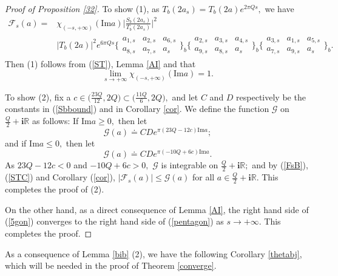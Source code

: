 \documentclass[11pt]{article}
\theoremstyle{remark}
\theoremstyle{remark}
\numberwithin{equation}{section}
\begin{document}
\begin{proof}[Proof of Proposition \ref{32}]
To show (1), as $T_b(2a_s)=T_b(2a)e^{2\pi Qs},$ we have
\begin{equation}\label{FsB}
    \begin{split}
        \mathcal F_s(a)= &\chi_{(-s,+\infty)}(\mathrm{Im}a)\Bigg|\frac{S_b(2a_s)}{T_b(2a_s)}\Bigg|^2\\
&|T_b(2a)|^2
e^{6\pi Q s} \bigg\{\begin{matrix} 
    a_{1,s} & a_{2,s} & a_{6,s}\\
      a_{8,s} & a_{7,s} & a_s 
   \end{matrix}\bigg\}_b
   \bigg\{\begin{matrix} 
    a_{2,s} & a_{3,s} & a_{4,s}\\
      a_{9,s} & a_{8,s} & a_s 
   \end{matrix}\bigg\}_b
 \bigg\{\begin{matrix} 
    a_{3,s} & a_{1,s} & a_{5,s}\\
      a_{7,s} & a_{9,s} & a_s 
   \end{matrix}\bigg\}_b.
    \end{split}
\end{equation}
Then (1) follows from (\ref{ST}), Lemma \ref{AI} and that 
$$\lim_{s\to +\infty}\chi_{(-s,+\infty)}(\mathrm{Im}a)=1.$$

To show (2), fix a $c\in \big(\frac{23Q}{12},2Q)\subset\big(\frac{11Q}{6},2Q\big),$ and let $C$ and $D$ respectively be the constants in (\ref{Sbbound}) and in Corollary \ref{cor}. We define the function $\mathcal G$ on $\frac{Q}{2}+\mathbf i\mathbb R$ as follows: If $\mathrm{Im}a\geqslant 0,$ then let
$$\mathcal G(a) \doteq CD e^{\pi (23Q-12c)\mathrm{Im}a};$$
and if $\mathrm{Im}a\leqslant 0,$ then let
$$\mathcal G(a) \doteq  CD e^{\pi (-10Q+6c)\mathrm{Im}a}.$$
As $23Q-12c<0$ and $-10Q+6c>0,$ $\mathcal G$ is integrable on $\frac{Q}{2}+\mathbf i\mathbb R;$ and by (\ref{FsB}), (\ref{STC}) and Corollary (\ref{cor}),  $|\mathcal F_s(a)|\leqslant \mathcal G(a)$ for all $a\in\frac{Q}{2}+\mathbf i\mathbb R.$ This completes the proof of (2).
\medskip

On the other hand, as a direct consequence of Lemma \ref{AI}, the right hand side of (\ref{5gon}) converges to the right hand side of (\ref{pentagon}) as $s\to +\infty.$ This completes the proof. 
\end{proof}


As a consequence of Lemma \ref{bib} (2), we have the following Corollary  \ref{thetabj}, which will be needed in the proof of Theorem \ref{converge}.
\end{document}
